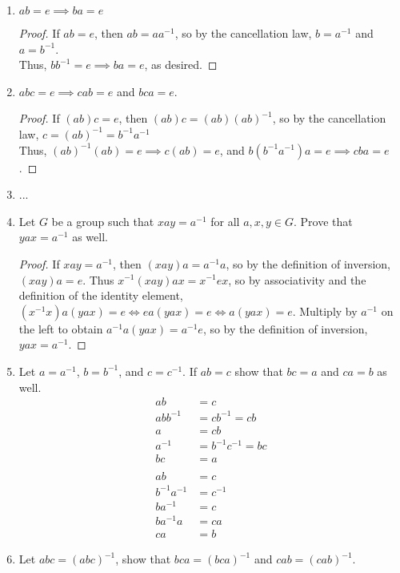 \begin{enumerate}[label={\Alph*.},font={\bfseries}]
\begin{enumerate}[label={\arabic*},font={\bfseries}]
  \item $ab = e \implies ba = e$
    \begin{proof}
      If $ab = e$, then $ab = aa^{-1}$, so by the cancellation law, $b = a^{-1}$ and $a = b^{-1}$. \\
      Thus, $bb^{-1} = e \implies ba = e$, as desired.
    \end{proof}
  \item $abc = e \implies cab = e$ and $bca = e$.
    \begin{proof}
      If $(ab)c = e$, then $(ab)c = (ab)(ab)^{-1}$, so by the cancellation law, $c = (ab)^{-1} = b^{-1}a^{-1}$ \\
      Thus, $(ab)^{-1}(ab) = e \implies c(ab) = e$, and $b(b^{-1}a^{-1})a = e \implies cba = e$.
    \end{proof}
  \item ...
  \item Let $G$ be a group such that $xay = a^{-1}$ for all $a,x,y \in G$.
    Prove that $yax = a^{-1}$ as well.
    \begin{proof}
      If $xay = a^{-1}$, then $(xay)a = a^{-1}a$, so by the definition of inversion, $(xay)a = e$.
      Thus $x^{-1}(xay)ax = x^{-1}ex$, so by associativity and the definition of the identity element, $(x^{-1}x)a(yax) = e \iff ea(yax) = e \iff a(yax) = e$.
      Multiply by $a^{-1}$ on the left to obtain $a^{-1}a(yax) = a^{-1}e$, so by the definition of inversion, $yax = a^{-1}$.
    \end{proof}
  \item Let $a = a^{-1}$, $b = b^{-1}$, and $c = c^{-1}$. If $ab = c$ show that $bc = a$ and $ca = b$ as well.
    \begin{align*}
      ab &= c \\
      abb^{-1} &= cb^{-1} = cb \\
      a &= cb \\
      a^{-1} &= b^{-1}c^{-1} = bc \\
      bc &= a \\
      \\
      ab &= c \\
      b^{-1}a^{-1} &= c^{-1} \\
      ba^{-1} &= c \\
      ba^{-1}a &= ca \\
      ca &= b
    \end{align*}
  \item Let $abc = (abc)^{-1}$, show that $bca = (bca)^{-1}$ and $cab = (cab)^{-1}$.
    \begin{align*}

\end{align*}
\end{enumerate}
\end{enumerate}

